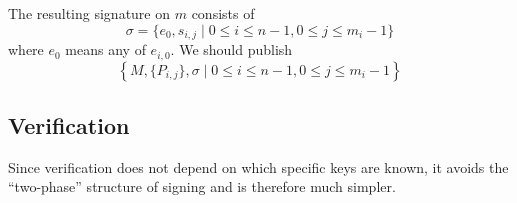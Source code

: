 \documentclass[a4paper,10pt]{article}
\begin{document}
The resulting signature on $m$ consists of
	\begin{equation}
		\sigma = \{ e_0, s_{i, j}\mid 0\leq i\leq n-1, 0\leq j\leq m_i - 1 \}
	\end{equation}
	where \(e_0\) means any of \(e_{i,0}\). We should publish 
	\begin{equation}
		\left\{M,\{P_{i,j}\},\sigma\mid 0\leq i\leq n-1, 0\leq j\leq m_i-1\right\}
	\end{equation}

\subsection{Verification}
Since verification does not depend on which specific keys are known, it avoids the ``two-phase'' structure of signing and is therefore much simpler.
\end{document}
